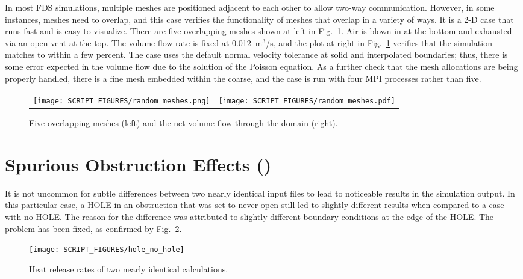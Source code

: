 \documentclass[11pt]{book}
\begin{document}
In most FDS simulations, multiple meshes are positioned adjacent to each other to allow two-way communication. However, in some instances, meshes need to overlap, and this case verifies the functionality of meshes that overlap in a variety of ways. It is a 2-D case that runs fast and is easy to visualize. There are five overlapping meshes shown at left in Fig.~\ref{random_meshes_fig}. Air is blown in at the bottom and exhausted via an open vent at the top. The volume flow rate is fixed at 0.012~m$^3$/s, and the plot at right in Fig.~\ref{random_meshes_fig} verifies that the simulation matches to within a few percent. The case uses the default normal velocity tolerance at solid and interpolated boundaries; thus, there is some error expected in the volume flow due to the solution of the Poisson equation. As a further check that the mesh allocations are being properly handled, there is a fine mesh embedded within the coarse, and the case is run with four MPI processes rather than five.

\begin{figure}[!ht]
\begin{tabular*}{\textwidth}{lr}
\texttt{[image: SCRIPT\_FIGURES/random\_meshes.png]} &
\texttt{[image: SCRIPT\_FIGURES/random\_meshes.pdf]}
\end{tabular*}
\caption[The  test case]{Five overlapping meshes (left) and the net volume flow through the domain (right).}
\label{random_meshes_fig}
\end{figure}


\newpage

\section{Spurious Obstruction Effects (\texorpdfstring{}{hole})}
\label{hole}

It is not uncommon for subtle differences between two nearly identical input files to lead to noticeable results in the simulation output. In this particular case, a {\ct HOLE} in an obstruction that was set to never open still led to slightly different results when compared to a case with no {\ct HOLE}. The reason for the difference was attributed to slightly different boundary conditions at the edge of the {\ct HOLE}. The problem has been fixed, as confirmed by Fig.~\ref{hole_fig}.

\begin{figure}[!ht]
\centering
\texttt{[image: SCRIPT\_FIGURES/hole\_no\_hole]}
\caption[Results of the  test case]{Heat release rates of two nearly identical calculations.}
\label{hole_fig}
\end{figure}
\end{document}
